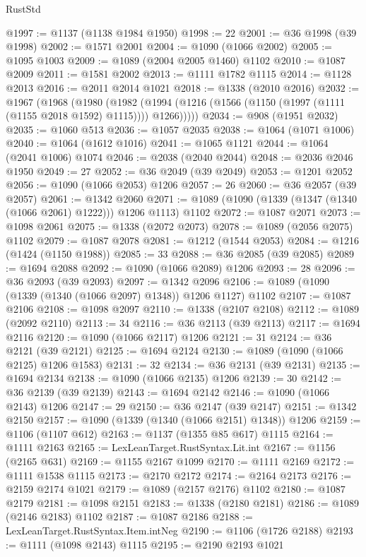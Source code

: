 \begin{lexlean}{RustStd}
\begin{coremodule}
@1997 := @1137 (@1138 @1984 @1950)
@1998 := 22
@2001 := @36 @1998 (@39 @1998)
@2002 := @1571 @2001
@2004 := @1090 (@1066 @2002)
@2005 := @1095 @1003
@2009 := @1089 (@2004 @2005 @1460) @1102
@2010 := @1087 @2009
@2011 := @1581 @2002
@2013 := @1111 @1782 @1115
@2014 := @1128 @2013
@2016 := @2011 @2014 @1021
@2018 := @1338 (@2010 @2016)
@2032 := @1967
    (@1968
      (@1980
        (@1982 (@1994 (@1216 (@1566 (@1150 (@1997 (@1111 (@1155 @2018 @1592) @1115)))) @1266)))))
@2034 := @908 (@1951 @2032)
@2035 := @1060 @513
@2036 := @1057 @2035
@2038 := @1064 (@1071 @1006)
@2040 := @1064 (@1612 @1016)
@2041 := @1065 @1121
@2044 := @1064 (@2041 @1006) @1074
@2046 := @2038 (@2040 @2044)
@2048 := @2036 @2046 @1950
@2049 := 27
@2052 := @36 @2049 (@39 @2049)
@2053 := @1201 @2052
@2056 := @1090 (@1066 @2053) @1206
@2057 := 26
@2060 := @36 @2057 (@39 @2057)
@2061 := @1342 @2060
@2071 := @1089 (@1090 (@1339 (@1347 (@1340 (@1066 @2061) @1222))) @1206 @1113) @1102
@2072 := @1087 @2071
@2073 := @1098 @2061
@2075 := @1338 (@2072 @2073)
@2078 := @1089 (@2056 @2075) @1102
@2079 := @1087 @2078
@2081 := @1212 (@1544 @2053)
@2084 := @1216 (@1424 (@1150 @1988))
@2085 := 33
@2088 := @36 @2085 (@39 @2085)
@2089 := @1694 @2088
@2092 := @1090 (@1066 @2089) @1206
@2093 := 28
@2096 := @36 @2093 (@39 @2093)
@2097 := @1342 @2096
@2106 := @1089 (@1090 (@1339 (@1340 (@1066 @2097) @1348)) @1206 @1127) @1102
@2107 := @1087 @2106
@2108 := @1098 @2097
@2110 := @1338 (@2107 @2108)
@2112 := @1089 (@2092 @2110)
@2113 := 34
@2116 := @36 @2113 (@39 @2113)
@2117 := @1694 @2116
@2120 := @1090 (@1066 @2117) @1206
@2121 := 31
@2124 := @36 @2121 (@39 @2121)
@2125 := @1694 @2124
@2130 := @1089 (@1090 (@1066 @2125) @1206 @1583)
@2131 := 32
@2134 := @36 @2131 (@39 @2131)
@2135 := @1694 @2134
@2138 := @1090 (@1066 @2135) @1206
@2139 := 30
@2142 := @36 @2139 (@39 @2139)
@2143 := @1694 @2142
@2146 := @1090 (@1066 @2143) @1206
@2147 := 29
@2150 := @36 @2147 (@39 @2147)
@2151 := @1342 @2150
@2157 := @1090 (@1339 (@1340 (@1066 @2151) @1348)) @1206
@2159 := @1106 (@1107 @612)
@2163 := @1137 (@1355 @85 @617) @1115
@2164 := @1111 @2163
@2165 := LexLeanTarget.RustSyntax.Lit.int
@2167 := @1156 (@2165 @631)
@2169 := @1155 @2167 @1099
@2170 := @1111 @2169
@2172 := @1111 @1538 @1115
@2173 := @2170 @2172
@2174 := @2164 @2173
@2176 := @2159 @2174 @1021
@2179 := @1089 (@2157 @2176) @1102
@2180 := @1087 @2179
@2181 := @1098 @2151
@2183 := @1338 (@2180 @2181)
@2186 := @1089 (@2146 @2183) @1102
@2187 := @1087 @2186
@2188 := LexLeanTarget.RustSyntax.Item.intNeg
@2190 := @1106 (@1726 @2188)
@2193 := @1111 (@1098 @2143) @1115
@2195 := @2190 @2193 @1021

\end{coremodule}
\end{lexlean}

